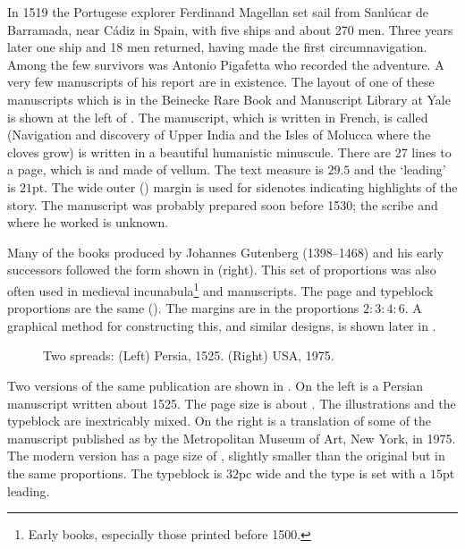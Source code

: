 \documentclass[10pt,letterpaper,extrafontsizes]{memoir}
\begin{document}
    In 1519 the Portugese explorer Ferdinand Magellan set sail from 
Sanl\'{u}car de Barramada, near C\'{a}diz in Spain, 
with five ships and about 270 men.
Three years later one ship and 18 men returned, having made the first
circumnavigation. Among the few survivors was Antonio Pigafetta who recorded
the adventure. 
A very few manuscripts of his report are in existence.
The layout of one of these manuscripts which is in the Beinecke Rare
Book and Manuscript Library at Yale is shown at the left of .
The manuscript, which is written in French, is called 
 (Navigation and discovery
of Upper India and the Isles of Molucca where the cloves grow) is written
in a beautiful humanistic minuscule. 
There are 27 lines to a page, which
is  and made of vellum. The text measure is $29.5$
and the `leading' is $21$pt. The wide outer (\foredge) margin is used 
for sidenotes
indicating highlights of the story. The manuscript was probably prepared 
soon before 1530; the scribe and where he worked is unknown.

    Many of the books produced by Johannes Gutenberg
(1398--1468) and his early successors followed the form shown in
 (right). This set of proportions was also often used in
medieval incunabula\footnote{Early books, especially 
those printed before 1500.}  and manuscripts. The page and typeblock 
proportions are the same (). The margins are in the 
proportions $2 : 3 : 4 : 6$.
A graphical method for constructing this, and similar designs, is 
shown later in .

\begin{figure}
\centering
\begin{minipage}[b]{\pwlayi}
\end{minipage}
\hfill
\begin{minipage}[b]{\pwlayi}
\end{minipage}
\caption[Two spreads: Persia, 1525 and USA, 1975]%
        {Two spreads: (Left) Persia, 1525.
         (Right) USA, 1975.} \label{fb:10}
\end{figure}

     Two versions of the same publication are shown in .
On the left is a Persian manuscript  written
about 1525. The page size is about . The 
illustrations and
the typeblock are inextricably mixed. On the right is a translation of
some of the manuscript published as 
by the Metropolitan Museum of Art, New York, in 1975. The modern version
has a page size of , slightly smaller than the original
but in the same proportions. The typeblock is $32$pc wide 
and the type is set with a $15$pt leading.
\end{document}

